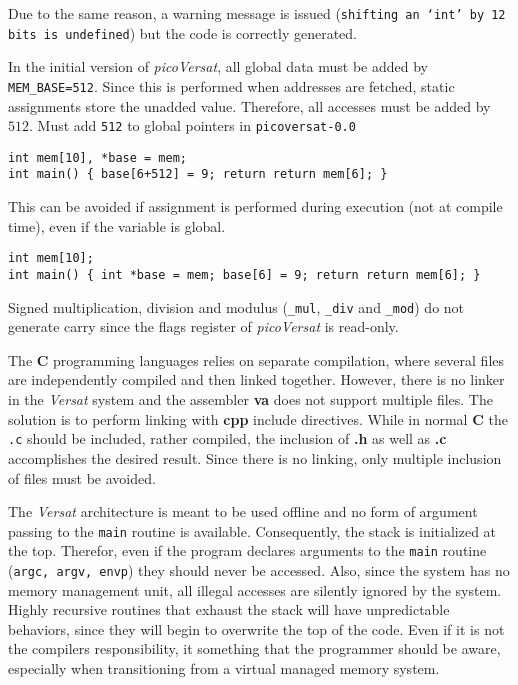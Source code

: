 Due to the same reason, a warning message is issued
({\tt shifting an `int' by 12 bits is undefined})
but the code is correctly generated.


In the initial version of {\it picoVersat}, all global
data must be added by {\tt MEM\_BASE=512}.
Since this is performed when addresses are fetched,
static assignments store the unadded value.
Therefore, all accesses must be added by $512$.
Must add {\tt 512} to global pointers in {\tt picoversat-0.0}
\begin{verbatim}
int mem[10], *base = mem;
int main() { base[6+512] = 9; return return mem[6]; }
\end{verbatim}
This can be avoided if assignment is performed during
execution (not at compile time), even if the variable
is global.
\begin{verbatim}
int mem[10];
int main() { int *base = mem; base[6] = 9; return return mem[6]; }
\end{verbatim}

Signed multiplication, division and modulus ({\tt \_mul},
{\tt \_div} and {\tt \_mod}) do not generate carry since
the flags register of {\it picoVersat} is read-only.

The {\bf C} programming languages relies on separate
compilation, where several files are independently
compiled and then linked together.
However, there is no linker in the {\it Versat} system
and the assembler {\bf va} does not support multiple
files.
The solution is to perform linking with {\bf cpp} %
include directives.
While in normal {\bf C} the {\tt .c} should be
included, rather compiled, the inclusion of {\bf .h}
as well as {\bf .c} accomplishes the desired result.
Since there is no linking, only multiple inclusion
of files must be avoided.

The {\it Versat} architecture is meant to be used offline
and no form of argument passing to the {\tt main} routine
is available.
Consequently, the stack is initialized at the top.
Therefor, even if the program declares arguments to
the {\tt main} routine ({\tt argc, argv, envp}) they should
never be accessed.
Also, since the system has no memory management unit,
all illegal accesses are silently ignored by the system.
Highly recursive routines that exhaust the stack will have
unpredictable behaviors, since they will begin to overwrite
the top of the code.
Even if it is not the compilers responsibility, it something
that the programmer should be aware, especially when
transitioning from a virtual managed memory system.

